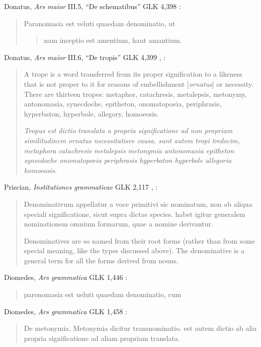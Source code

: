 \documentclass{article}
\begin{document}
Donatus, {\em Ars maior} III.5, ``De schematibus'' GLK 4,398 \cite{GLK}:

\begin{quote}
Paranomasia est veluti quaedam denominatio, ut
\begin{quote}
nam inceptio est amentium, haut amantium.
\end{quote}
\end{quote}

Donatus, {\em Ars maior} III.6, ``De tropis'' GLK 4,399 \cite{GLK}, \cite[p.~97]{MGR}:

\begin{quote}
A trope is a word transferred from its proper signification to a likeness that is not proper to
it for reasons of embellishment [{\em ornatus}] or necessity. There are thirteen tropes: metaphor,
catachresis, metalepsis, metonymy, antonomasia, synecdoche, epitheton, onomatopoeia,
periphrasis, hyperbaton, hyperbole, allegory, homoeosis.

{\em Tropus est dictio translata a propria significatione ad non propriam
similitudinem ornatus necessitatisve causa. sunt autem tropi tredecim,
metaphora catachresis metalepsis metonymia antonomasia epitheton synecdoche
onomatopoeia periphrasis hyperbaton hyperbole allegoria homoeosis.}
\end{quote}

Priscian, {\em Institutiones grammaticae} GLK 2,117 \cite{GLK}, \cite[pp.~86--87]{aelfric}:

\begin{quote}
Denominativum appellatur a voce primitivi sic nominatum, non ab
aliqua speciali significatione, sicut supra dictae species. habet igitur generalem
nominationem omnium formarum, quae a nomine derivantur.

Denominatives are so named from their root forms (rather than from
some special meaning, like the types discussed above). The denominative is a
general term for all the forms derived from nouns.
\end{quote}

Diomedes, {\em Ars grammatica} GLK 1,446 \cite{GLK}:

\begin{quote}
paronomasia est ueluti quaedam denominatio, cum
\end{quote}

Diomedes, {\em Ars grammatica} GLK 1,458 \cite{GLK}:

\begin{quote}
De metonymia. Metonymia dicitur transnominatio. est autem dictio
ab alia propria significatione ad aliam propriam translata.
\end{quote}
\end{document}
